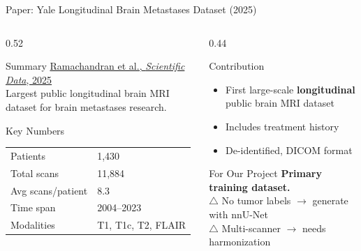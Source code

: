 \documentclass[aspectratio=169,xcolor=dvipsnames]{beamer}
\begin{document}
\begin{frame}{Paper: Yale Longitudinal Brain Metastases Dataset (2025)}
    \begin{columns}
        \begin{column}{0.52\textwidth}
            \begin{block}{Summary}
                \small
                \href{https://doi.org/10.1038/s41597-025-04360-7}{Ramachandran et al., \textit{Scientific Data}, 2025}\\[0.3em]
                Largest public longitudinal brain MRI dataset for brain metastases research.
            \end{block}

            \vspace{0.2em}

            \begin{block}{Key Numbers}
                \small
                \begin{tabular}{ll}
                    Patients & 1,430 \\
                    Total scans & 11,884 \\
                    Avg scans/patient & 8.3 \\
                    Time span & 2004--2023 \\
                    Modalities & T1, T1c, T2, FLAIR \\
                \end{tabular}
            \end{block}
        \end{column}

        \begin{column}{0.44\textwidth}
            \begin{block}{Contribution}
                \small
                \begin{itemize}
                    \item First large-scale \textbf{longitudinal} public brain MRI dataset
                    \item Includes treatment history
                    \item De-identified, DICOM format
                \end{itemize}
            \end{block}

            \vspace{0.2em}

            \begin{alertblock}{For Our Project}
                \small
                \textbf{Primary training dataset.}\\
                $\triangle$ No tumor labels $\to$ generate with nnU-Net\\
                $\triangle$ Multi-scanner $\to$ needs harmonization
            \end{alertblock}


\end{column}
\end{columns}
\end{frame}
\end{document}
